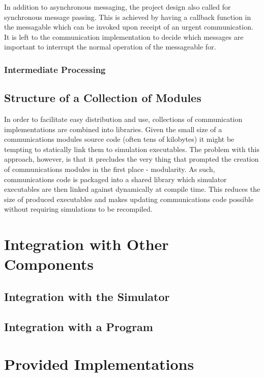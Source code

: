 In addition to asynchronous messaging, the project design also called for synchronous message passing. This is achieved by having a callback function in the messagable which can be invoked upon receipt of an urgent communication. It is left to the communication implementation to decide which messages are important to interrupt the normal operation of the messageable for.
		
		\subsubsection{Intermediate Processing}
		
	\subsection{Structure of a Collection of Modules}
	
In order to facilitate easy distribution and use, collections of communication implementations are combined into libraries. Given the small size of a communications modules source code (often tens of kilobytes) it might be tempting to statically link them to simulation executables. The problem with this approach, however, is that it precludes the very thing that prompted the creation of communications modules in the first place - modularity. As such, communications code is packaged into a shared library which simulator executables are then linked against dynamically at compile time. This reduces the size of produced executables and makes updating communications code possible without requiring simulations to be recompiled.

\section{Integration with Other Components}
	\subsection{Integration with the Simulator}
		\label{int-sim}
	\subsection{Integration with a Program}
		\label{int-pro}

\section{Provided Implementations}

